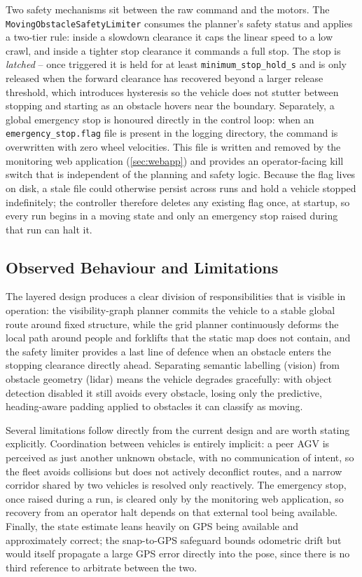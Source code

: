 Two safety mechanisms sit between the raw command and the motors. The \texttt{MovingObstacleSafetyLimiter} consumes the planner's safety status and applies a two-tier rule: inside a slowdown clearance it caps the linear speed to a low crawl, and inside a tighter stop clearance it commands a full stop. The stop is \emph{latched} -- once triggered it is held for at least \texttt{minimum\_stop\_hold\_s} and is only released when the forward clearance has recovered beyond a larger release threshold, which introduces hysteresis so the vehicle does not stutter between stopping and starting as an obstacle hovers near the boundary. Separately, a global emergency stop is honoured directly in the control loop: when an \texttt{emergency\_stop.flag} file is present in the logging directory, the command is overwritten with zero wheel velocities. This file is written and removed by the monitoring web application (\cref{sec:webapp}) and provides an operator-facing kill switch that is independent of the planning and safety logic. Because the flag lives on disk, a stale file could otherwise persist across runs and hold a vehicle stopped indefinitely; the controller therefore deletes any existing flag once, at startup, so every run begins in a moving state and only an emergency stop raised during that run can halt it.

\subsection{Observed Behaviour and Limitations}
\label{subsec:controllers-behaviour}

The layered design produces a clear division of responsibilities that is visible in operation: the visibility-graph planner commits the vehicle to a stable global route around fixed structure, while the grid planner continuously deforms the local path around people and forklifts that the static map does not contain, and the safety limiter provides a last line of defence when an obstacle enters the stopping clearance directly ahead. Separating semantic labelling (vision) from obstacle geometry (lidar) means the vehicle degrades gracefully: with object detection disabled it still avoids every obstacle, losing only the predictive, heading-aware padding applied to obstacles it can classify as moving.

Several limitations follow directly from the current design and are worth stating explicitly. Coordination between vehicles is entirely implicit: a peer AGV is perceived as just another unknown obstacle, with no communication of intent, so the fleet avoids collisions but does not actively deconflict routes, and a narrow corridor shared by two vehicles is resolved only reactively. The emergency stop, once raised during a run, is cleared only by the monitoring web application, so recovery from an operator halt depends on that external tool being available. Finally, the state estimate leans heavily on GPS being available and approximately correct; the snap-to-GPS safeguard bounds odometric drift but would itself propagate a large GPS error directly into the pose, since there is no third reference to arbitrate between the two.

